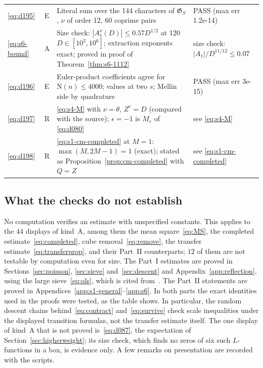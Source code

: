 \documentclass[11pt]{article}
\numberwithin{equation}{section}
\newcommand{\N}{\mathrm N}
\begin{document}
\begin{longtable}{@{}>{\raggedright\arraybackslash}p{1.2cm}>{\centering\arraybackslash}p{0.7cm}>{\raggedright\arraybackslash}p{9.05cm}>{\raggedright\arraybackslash}p{4.3cm}@{}}
\eqref{eq:d195} & E & Literal sum over the 144 characters of $\mathfrak G_S$, $\nu$ of order 12, 60 coprime pairs & PASS (max err 1.2e-14)\\
\eqref{eq:s6-bound} & A & Size check: $|A_1^\nu(D)|\le0.57D^{1/2}$ at 120 $D\in[10^2,10^6]$; extraction exponents exact; proved in proof of Theorem~\ref{thm:s6-1112} & size check: $|A_1|/D^{11/12}\le0.07$\\
\eqref{eq:d196} & E & Euler-product coefficients agree for $\N(n)\le4000$; values at two $s$; Mellin side by quadrature & PASS (max err 3e-15)\\
\eqref{eq:d197} & R & \eqref{eq:s4-M} with $\nu=\theta$, $Z^r=D$ (compared with the source); $\epsilon=-1$ is $M_r$ of \eqref{eq:d080} & see \eqref{eq:s4-M}\\
\eqref{eq:d198} & R & \eqref{eq:s1-cm-completed} at $M=1$: $\max(M,2M-1)=1$ (exact); stated as Proposition~\ref{prop:cm-completed} with $Q=Z$ & see \eqref{eq:s1-cm-completed}\\
\end{longtable}
\endgroup

\subsection{What the checks do not establish}\label{sec:numerics-limits}

No computation verifies an estimate with unspecified constants. This applies to the $44$ displays of kind~A,
among them the mean square~\eqref{eq:MS}, the completed estimate~\eqref{eq:completed}, cube
removal~\eqref{eq:remove}, the transfer estimate~\eqref{eq:transferprop}, and their Part~II counterparts; $12$ of
them are not testable by computation even for size. The Part~I estimates are proved in Sections~\ref{sec:poisson},
\ref{sec:sieve} and~\ref{sec:descent} and Appendix~\ref{app:reflection}, using the large sieve~\eqref{eq:qls}, which
is cited from~\cite{GL}. The Part~II statements are proved in Appendices~\ref{app:s1-general}--\ref{app:s6}. In both
parts the exact identities used in the proofs were tested, as the table shows. In particular, the random descent
chains behind~\eqref{eq:contract} and~\eqref{eq:survive} check scale inequalities under the displayed transition
formulas, not the transfer estimate itself. The one display of kind~A that is
not proved is~\eqref{eq:d087}, the expectation of Section~\ref{sec:higherweight}; its size check, which finds no
zeros of six such $L$-functions in a box, is evidence only.
A few remarks on presentation are recorded with the scripts.
\end{document}
